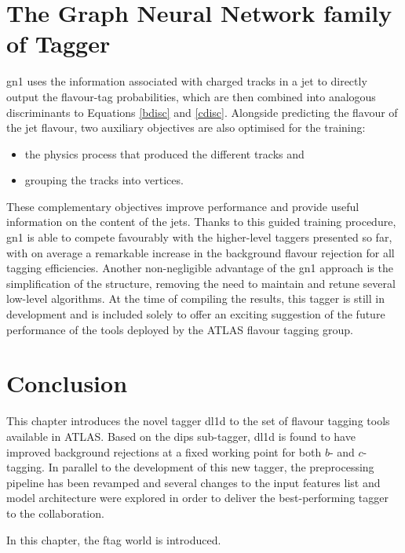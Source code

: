 \section{The Graph Neural Network family of Tagger}
\gls{gn1} uses the information associated with charged tracks in a jet to directly output the flavour-tag probabilities, which are then combined into analogous discriminants to Equations \ref{bdisc} and \ref{cdisc}. Alongside predicting the flavour of the jet flavour, two auxiliary objectives are also optimised for the training: 
\begin{itemize}
\item the physics process that produced the different tracks and
\item grouping the tracks into vertices.
\end{itemize}
These complementary objectives improve performance and provide useful information on the content of the jets. Thanks to this guided training procedure, \gls{gn1} is able to compete favourably with the higher-level taggers presented so far, with on average a remarkable increase in the background flavour rejection for all tagging efficiencies. Another non-negligible advantage of the \gls{gn1} approach is the simplification of the structure, removing the need to maintain and retune several low-level algorithms. At the time of compiling the results, this tagger is still in development and is included solely to offer an exciting suggestion of the future performance of the tools deployed by the ATLAS flavour tagging group. 

\section{Conclusion}
This chapter introduces the novel tagger \gls{dl1d} to the set of flavour tagging tools available in ATLAS. Based on the \gls{dips} sub-tagger, \gls{dl1d} is found to have improved background rejections at a fixed working point for both $b$- and $c$-tagging. In parallel to the development of this new tagger, the preprocessing pipeline has been revamped and several changes to the input features list and model architecture were explored in order to deliver the best-performing tagger to the collaboration. 
\clearpage


\begin{tcolorbox}[colback=oxfordblue!5,colframe=blue!40!black,title=Summary of the Chapter]
In this chapter, the \gls{ftag} world is introduced. 
\end{tcolorbox}
